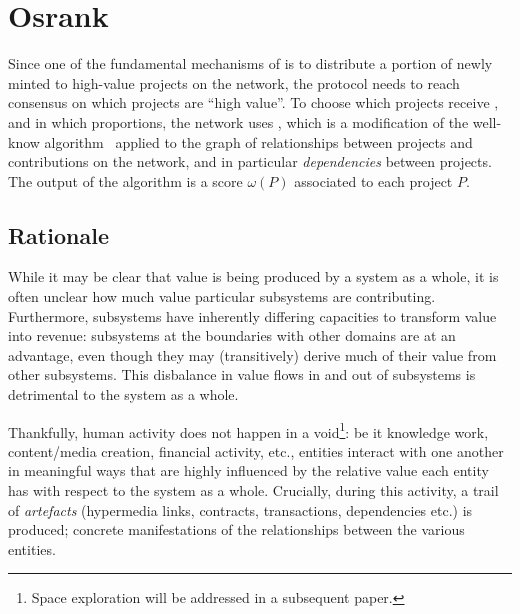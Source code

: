 \section{Osrank}
\label{s:osrank}

\def\Graph{\mathsf{Graph}}
\def\proj{\mathsf{proj}}
\def\user{\mathsf{user}}
\def\dep{\mathsf{dep}}
\def\own{\mathsf{own}}
\def\coown{\mathsf{own}^\circ}
\def\contrib{\mathsf{contrib}}
\def\cocontrib{\mathsf{contrib}^\circ}

Since one of the fundamental mechanisms of \oscoin{} is to distribute a portion
of newly minted \oscoin{} to high-value projects on the network, the protocol
needs to reach consensus on which projects are ``high value''. To choose which
projects receive \oscoin{}, and in which proportions, the network uses
\osrank{}, which is a modification of the well-know \pagerank{}
algorithm~\cite{pagerank} applied to the graph of relationships between
projects and contributions on the network, and in particular
\emph{dependencies} between projects. The output of the algorithm is a score
$\omega(P)$ associated to each project $P$.

\subsection{Rationale}

While it may be clear that value is being produced by a system as a whole, it is
often unclear how much value particular subsystems are
contributing. Furthermore, subsystems have inherently differing capacities to
transform value into revenue: subsystems at the boundaries with other domains
are at an advantage, even though they may (transitively) derive much of their
value from other subsystems. This disbalance in value flows in and out of
subsystems is detrimental to the system as a whole.

Thankfully, human activity does not happen in a void\footnote{Space
  exploration will be addressed in a subsequent paper.}: be it
knowledge work, content/media creation, financial activity, etc.,
entities interact with one another in meaningful ways that are highly
influenced by the relative value each entity has with respect to the
system as a whole. Crucially, during this activity, a trail of
\emph{artefacts} (hypermedia links, contracts, transactions,
dependencies etc.) is produced; concrete manifestations
of the relationships between the various entities.


